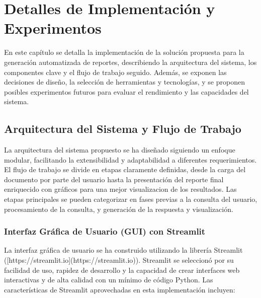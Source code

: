 \chapter{Detalles de Implementación y Experimentos}\label{chapter:implementation}

En este capítulo se detalla la implementación de la solución propuesta para la generación automatizada de reportes, describiendo la arquitectura del sistema, los componentes clave y el flujo de trabajo seguido.  Además, se exponen las decisiones de diseño, la selección de herramientas y tecnologías, y se proponen posibles experimentos futuros para evaluar el rendimiento y las capacidades del sistema.

\section{Arquitectura del Sistema y Flujo de Trabajo}

La arquitectura del sistema propuesto se ha diseñado siguiendo un enfoque modular, facilitando la extensibilidad y adaptabilidad a diferentes requerimientos. El flujo de trabajo se divide en etapas claramente definidas, desde la carga del documento por parte del usuario hasta la presentación del reporte final enriquecido con gráficos para una mejor visualizacion de los resultados. Las etapas principales se pueden categorizar en fases previas a la consulta del usuario, procesamiento de la consulta, y generación de la respuesta y visualización.

\subsection{Interfaz Gráfica de Usuario (GUI) con Streamlit}

La interfaz gráfica de usuario se ha construido utilizando la librería Streamlit ([https://streamlit.io](https://streamlit.io)).  Streamlit se seleccionó por su facilidad de uso,  rapidez de desarrollo y la capacidad de crear interfaces web interactivas y de alta calidad con un mínimo de código Python.  Las características de Streamlit aprovechadas en esta implementación incluyen:

